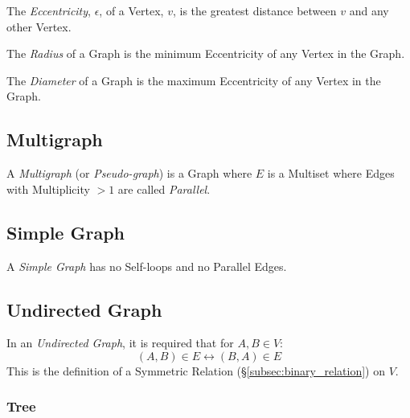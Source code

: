\documentclass{article}
\begin{document}
The \emph{Eccentricity}, $\epsilon$, of a Vertex, $v$, is the greatest
distance between $v$ and any other Vertex.

The \emph{Radius} of a Graph is the minimum Eccentricity of any
Vertex in the Graph.

The \emph{Diameter} of a Graph is the maximum Eccentricity of any
Vertex in the Graph.



\subsection{Multigraph} \label{subsec:multigraph}

A \emph{Multigraph} (or \emph{Pseudo-graph}) is a Graph where $E$ is a
Multiset where Edges with Multiplicity $>1$ are called
\emph{Parallel}.



\subsection{Simple Graph} \label{subsec:simple_graph}

A \emph{Simple Graph} has no Self-loops and no Parallel Edges.



\subsection{Undirected Graph} \label{subsec:undirected_graph}

In an \emph{Undirected Graph}, it is required that for $A,B \in V$:
\[
    (A,B) \in E \leftrightarrow (B,A) \in E
\]
This is the definition of a Symmetric Relation
(\S\ref{subsec:binary_relation}) on $V$.

\subsubsection{Tree}\label{subsec:graph_tree}



\end{document}

